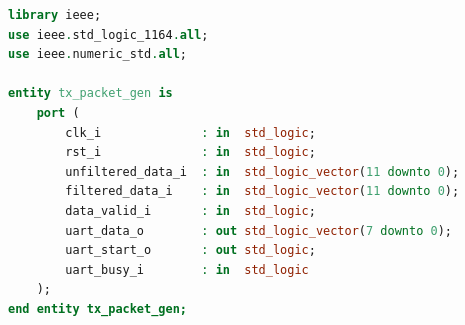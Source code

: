 \documentclass[a4paper,12pt]{article}
\begin{document}
\vspace{-1.5em}
\begin{center}
\end{center}
\vspace{-1.5em}

\begin{lstlisting}[language=VHDL, basicstyle=\tiny, lineskip=0em,belowskip=0em,aboveskip=0em, frame=single]
library ieee;
use ieee.std_logic_1164.all;
use ieee.numeric_std.all;

entity tx_packet_gen is
    port (
        clk_i              : in  std_logic;
        rst_i              : in  std_logic;
        unfiltered_data_i  : in  std_logic_vector(11 downto 0);
        filtered_data_i    : in  std_logic_vector(11 downto 0);
        data_valid_i       : in  std_logic;
        uart_data_o        : out std_logic_vector(7 downto 0);
        uart_start_o       : out std_logic;
        uart_busy_i        : in  std_logic
    );
end entity tx_packet_gen;


\end{lstlisting}
\end{document}
